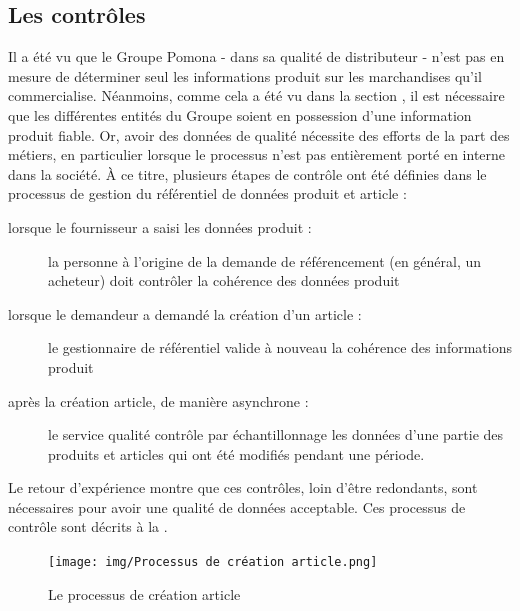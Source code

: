             \subsection{Les contrôles}

            Il a été vu que le Groupe Pomona - dans sa qualité de distributeur - n'est pas en mesure de déterminer seul les informations produit sur les marchandises qu'il commercialise.
            Néanmoins, comme cela a été vu dans la section , il est nécessaire que les différentes entités du Groupe soient en possession d'une information produit fiable.
            Or, avoir des données de qualité nécessite des efforts de la part des métiers, en particulier lorsque le processus n'est pas entièrement porté en interne dans la société.
            \`{A} ce titre, plusieurs étapes de contrôle ont été définies dans le processus de gestion du référentiel de données produit et article :
            \begin{description}
                \item[lorsque le fournisseur a saisi les données produit :] la personne à l'origine de la demande de référencement (en général, un acheteur) doit contrôler la cohérence des données produit
                \item[lorsque le demandeur a demandé la création d'un article :]  le gestionnaire de référentiel valide à nouveau la cohérence des informations produit
                \item[après la création article, de manière asynchrone :] le service qualité contrôle par échantillonnage les données d'une partie des produits et articles qui ont été modifiés pendant une période.
            \end{description}
            Le retour d'expérience montre que ces contrôles, loin d'être redondants, sont nécessaires pour avoir une qualité de données acceptable.
            Ces processus de contrôle sont décrits à la .

            \begin{figure}[htpb]
                \begin{center}
                \texttt{[image: img/Processus de création article.png]}
                \end{center}
                \caption{Le processus de création article}
                \label{fig:processus_article}
            \end{figure}    

